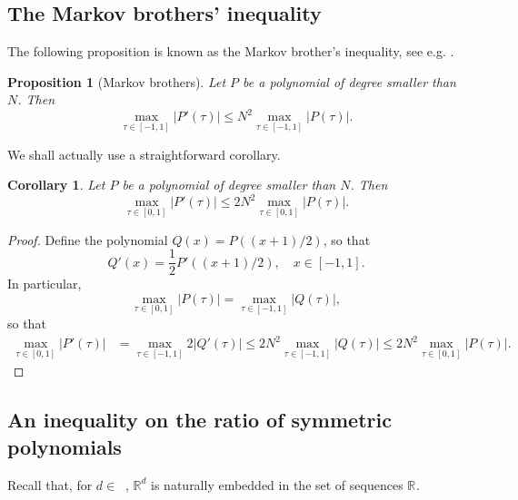 \documentclass[twoside,11pt]{book}
\newtheorem{corollary}{Corollary}
\newtheorem{proposition}{Proposition}
\numberwithin{theorem}{chapter}
\numberwithin{definition}{chapter}
\numberwithin{proposition}{chapter}
\numberwithin{corollary}{chapter}
\numberwithin{example}{chapter}
\numberwithin{lemma}{chapter}
\numberwithin{assumption}{chapter}
\DeclareMathOperator{\Ns}{\mathbb{N}^{*}}
\begin{document}
\subsection{The Markov brothers' inequality}
The following proposition is known as the Markov brother's inequality, see e.g. \citep{Sha04}.
\begin{proposition}[Markov brothers]\label{CVS_thm:Markov_Brothers_inequality}
Let $P$ be a polynomial of degree smaller than $N$. Then
\begin{equation}
\max_{\tau \in [-1,1]} |P'(\tau)| \leq N^{2}\max_{\tau \in [-1,1]}|P(\tau)|.
\end{equation}
\end{proposition}
We shall actually use a straightforward corollary.
\begin{corollary}\label{CVS_cor:Markov_Brothers_inequality_2}
Let $P$ be a polynomial of degree smaller than $N$. Then
\begin{equation}
\max_{\tau \in [0,1]} |P'(\tau)| \leq 2N^{2}\max_{\tau \in [0,1]}|P(\tau)|.
\end{equation}
\end{corollary}
\begin{proof}
Define the polynomial $Q(x) = P((x+1)/2)$, so that
\begin{equation}
Q'(x) = \frac{1}{2}P'((x+1)/2), \quad x\in[-1,1].
\end{equation}
In particular,
$$\max_{\tau \in [0,1]} |P(\tau)| = \max_{\tau \in [-1,1]} |Q(\tau)|,$$
so that
%
\begin{align}
\max_{\tau \in [0,1]} |P'(\tau)| & = \max_{\tau \in [-1,1]} 2|Q'(\tau)| \leq 2N^2\max_{\tau \in [-1,1]} |Q(\tau)| \leq 2N^2\max_{\tau \in [0,1]} |P(\tau)|.
\end{align}
\end{proof}
\subsection{An inequality on the ratio of symmetric polynomials}
\label{CVS_s:inequality_symmetric_polys}
Recall that, for $d \in \Ns$, $\mathbb{R}^{d}$ is naturally embedded in the set of sequences $\mathbb{R}^{\Ns}$.
\end{document}
